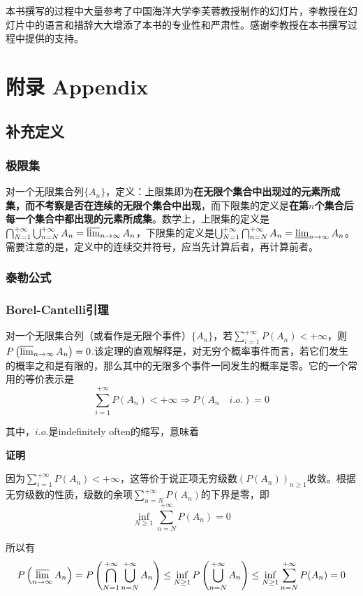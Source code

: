 \documentclass[UTF8]{ctexbook}
\begin{document}
本书撰写的过程中大量参考了中国海洋大学李芙蓉教授制作的幻灯片，李教授在幻灯片中的语言和措辞大大增添了本书的专业性和严肃性。感谢李教授在本书撰写过程中提供的支持。
\chapter{附录 Appendix}
\section{补充定义}
\subsection{极限集}
对一个无限集合列$\{A_n\}$，定义：上限集即为\textbf{在无限个集合中出现过的元素所成集，而不考察是否在连续的无限个集合中出现}，而下限集的定义是\textbf{在第$n$个集合后每一个集合中都出现的元素所成集}。数学上，上限集的定义是$\bigcap_{N=1}^{+\infty}\bigcup_{n=N}^{+\infty}A_n=\varlimsup_{n\to\infty}A_n$，下限集的定义是$\bigcup_{N=1}^{+\infty}\bigcap_{n=N}^{+\infty}A_n=\varliminf_{n\to\infty}A_n$。需要注意的是，定义中的连续交并符号，应当先计算后者，再计算前者。
\subsection{泰勒公式}
\label{taylors-theorem}

\subsection{Borel-Cantelli引理}
\label{borel-cantelli-lemma}
对一个无限集合列（或看作是无限个事件）$\{A_n\}$，若$\sum_{i=1}^{+\infty}P(A_n)<+\infty$，则$P\left(\varlimsup_{n\to\infty}A_n\right)=0$.该定理的直观解释是，对无穷个概率事件而言，若它们发生的概率之和是有限的，那么其中的无限多个事件一同发生的概率是零。它的一个常用的等价表示是
\[
	\sum_{i=1}^{+\infty}P(A_n)<+\infty\Longrightarrow P(A_n\quad i.o.)=0
\]

其中，$i.o.$是indefinitely often的缩写，意味着

\noindent\textbf{证明}

因为$\sum_{i=1}^{+\infty}P(A_n)<+\infty$，这等价于说正项无穷级数$(P(A_n))_{n\geq 1}$收敛。根据无穷级数的性质，级数的余项$\sum_{n=N}^{+\infty}P(A_n)$的下界是零，即
\[
	\inf_{N\geq 1}\sum_{n=N}^{+\infty}P(A_n)=0
\]

所以有
\[
	P\left(\varlimsup_{n\to\infty}A_n\right)=P\left(\bigcap_{N=1}^{+\infty}\bigcup_{n=N}^{+\infty}A_n\right)\leq\inf_{N\geq 1}P\left(\bigcup_{n=N}^{+\infty}A_n\right)\leq\inf_{N\geq 1}\sum_{n=N}^{+\infty}P(A_n)=0
\]
\end{document}
